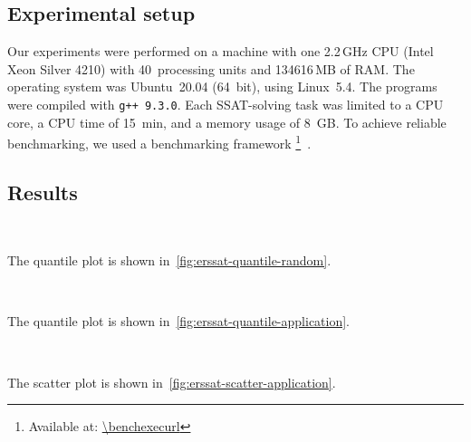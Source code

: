 \subsection{Experimental setup}
Our experiments were performed on a machine with
one 2.2\,GHz CPU (Intel Xeon Silver 4210) with 40~processing units and 134616\,MB of RAM.
The operating system was Ubuntu~20.04 (64~bit),
using Linux~5.4.
The programs were compiled with \texttt{g++ 9.3.0}.
Each SSAT-solving task was limited to a CPU core,
a CPU time of \SI{15}{min},
and a memory usage of \SI{8}{GB}.
To achieve reliable benchmarking,
we used a benchmarking framework \benchexec\footnote{Available at: \url{\benchexecurl}}~\cite{Benchmarking-STTT}.

\subsection{Results}

\begin{figure*}[ht]
    \centering
    \\
    \caption{Quantile plots of random $k$-CNF formulas}
    \label{fig:erssat-quantile-random}
\end{figure*}

The quantile plot is shown in~\cref{fig:erssat-quantile-random}.

\begin{figure*}[ht]
    \centering
    \\
    \caption{Quantile plots of application formulas}
    \label{fig:erssat-quantile-application}
\end{figure*}

The quantile plot is shown in~\cref{fig:erssat-quantile-application}.

\begin{figure*}[ht]
    \centering
    \subfloat[\erssatb]{
        
        \label{fig:erssat-scatter-cputime-application}
    }\\
    \subfloat[\dcssat]{
        
        \label{fig:dcssat-scatter-cputime-application}
    }
    \caption{CPU-time scatter plots of application formulas with \erssat in y-axis and compared approaches in x-axis}
    \label{fig:erssat-scatter-application}
\end{figure*}

The scatter plot is shown in~\cref{fig:erssat-scatter-application}.